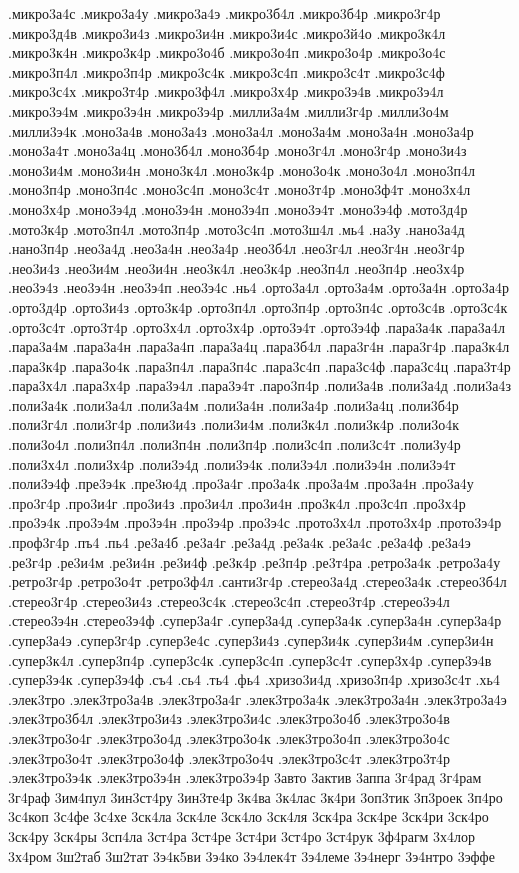 {.микро3а4с
.микро3а4у
.микро3а4э
.микро3б4л
.микро3б4р
.микро3г4р
.микро3д4в
.микро3и4з
.микро3и4н
.микро3и4с
.микро3й4о
.микро3к4л
.микро3к4н
.микро3к4р
.микро3о4б
.микро3о4п
.микро3о4р
.микро3о4с
.микро3п4л
.микро3п4р
.микро3с4к
.микро3с4п
.микро3с4т
.микро3с4ф
.микро3с4х
.микро3т4р
.микро3ф4л
.микро3х4р
.микро3э4в
.микро3э4л
.микро3э4м
.микро3э4н
.микро3э4р
.милли3а4м
.милли3г4р
.милли3о4м
.милли3э4к
.моно3а4в
.моно3а4з
.моно3а4л
.моно3а4м
.моно3а4н
.моно3а4р
.моно3а4т
.моно3а4ц
.моно3б4л
.моно3б4р
.моно3г4л
.моно3г4р
.моно3и4з
.моно3и4м
.моно3и4н
.моно3к4л
.моно3к4р
.моно3о4к
.моно3о4л
.моно3п4л
.моно3п4р
.моно3п4с
.моно3с4п
.моно3с4т
.моно3т4р
.моно3ф4т
.моно3х4л
.моно3х4р
.моно3э4д
.моно3э4н
.моно3э4п
.моно3э4т
.моно3э4ф
.мото3д4р
.мото3к4р
.мото3п4л
.мото3п4р
.мото3с4п
.мото3ш4л
.мь4
.на3у
.нано3а4д
.нано3п4р
.нео3а4д
.нео3а4н
.нео3а4р
.нео3б4л
.нео3г4л
.нео3г4н
.нео3г4р
.нео3и4з
.нео3и4м
.нео3и4н
.нео3к4л
.нео3к4р
.нео3п4л
.нео3п4р
.нео3х4р
.нео3э4з
.нео3э4н
.нео3э4п
.нео3э4с
.нь4
.орто3а4л
.орто3а4м
.орто3а4н
.орто3а4р
.орто3д4р
.орто3и4з
.орто3к4р
.орто3п4л
.орто3п4р
.орто3п4с
.орто3с4в
.орто3с4к
.орто3с4т
.орто3т4р
.орто3х4л
.орто3х4р
.орто3э4т
.орто3э4ф
.пара3а4к
.пара3а4л
.пара3а4м
.пара3а4н
.пара3а4п
.пара3а4ц
.пара3б4л
.пара3г4н
.пара3г4р
.пара3к4л
.пара3к4р
.пара3о4к
.пара3п4л
.пара3п4с
.пара3с4п
.пара3с4ф
.пара3с4ц
.пара3т4р
.пара3х4л
.пара3х4р
.пара3э4л
.пара3э4т
.паро3п4р
.поли3а4в
.поли3а4д
.поли3а4з
.поли3а4к
.поли3а4л
.поли3а4м
.поли3а4н
.поли3а4р
.поли3а4ц
.поли3б4р
.поли3г4л
.поли3г4р
.поли3и4з
.поли3и4м
.поли3к4л
.поли3к4р
.поли3о4к
.поли3о4л
.поли3п4л
.поли3п4н
.поли3п4р
.поли3с4п
.поли3с4т
.поли3у4р
.поли3х4л
.поли3х4р
.поли3э4д
.поли3э4к
.поли3э4л
.поли3э4н
.поли3э4т
.поли3э4ф
.пре3э4к
.пре3ю4д
.про3а4г
.про3а4к
.про3а4м
.про3а4н
.про3а4у
.про3г4р
.про3и4г
.про3и4з
.про3и4л
.про3и4н
.про3к4л
.про3с4п
.про3х4р
.про3э4к
.про3э4м
.про3э4н
.про3э4р
.про3э4с
.прото3х4л
.прото3х4р
.прото3э4р
.проф3г4р
.пъ4
.пь4
.ре3а4б
.ре3а4г
.ре3а4д
.ре3а4к
.ре3а4с
.ре3а4ф
.ре3а4э
.ре3г4р
.ре3и4м
.ре3и4н
.ре3и4ф
.ре3к4р
.ре3п4р
.ре3т4ра
.ретро3а4к
.ретро3а4у
.ретро3г4р
.ретро3о4т
.ретро3ф4л
.санти3г4р
.стерео3а4д
.стерео3а4к
.стерео3б4л
.стерео3г4р
.стерео3и4з
.стерео3с4к
.стерео3с4п
.стерео3т4р
.стерео3э4л
.стерео3э4н
.стерео3э4ф
.супер3а4г
.супер3а4д
.супер3а4к
.супер3а4н
.супер3а4р
.супер3а4э
.супер3г4р
.супер3е4с
.супер3и4з
.супер3и4к
.супер3и4м
.супер3и4н
.супер3к4л
.супер3п4р
.супер3с4к
.супер3с4п
.супер3с4т
.супер3х4р
.супер3э4в
.супер3э4к
.супер3э4ф
.съ4
.сь4
.ть4
.фь4
.хризо3и4д
.хризо3п4р
.хризо3с4т
.хь4
.элек3тро
.элек3тро3а4в
.элек3тро3а4г
.элек3тро3а4к
.элек3тро3а4н
.элек3тро3а4э
.элек3тро3б4л
.элек3тро3и4з
.элек3тро3и4с
.элек3тро3о4б
.элек3тро3о4в
.элек3тро3о4г
.элек3тро3о4д
.элек3тро3о4к
.элек3тро3о4п
.элек3тро3о4с
.элек3тро3о4т
.элек3тро3о4ф
.элек3тро3о4ч
.элек3тро3с4т
.элек3тро3т4р
.элек3тро3э4к
.элек3тро3э4н
.элек3тро3э4р
3авто
3актив
3аппа
3г4рад
3г4рам
3г4раф
3им4пул
3ин3ст4ру
3ин3те4р
3к4ва
3к4лас
3к4ри
3оп3тик
3п3роек
3п4ро
3с4коп
3с4фе
3с4хе
3ск4ла
3ск4ле
3ск4ло
3ск4ля
3ск4ра
3ск4ре
3ск4ри
3ск4ро
3ск4ру
3ск4ры
3сп4ла
3ст4ра
3ст4ре
3ст4ри
3ст4ро
3ст4рук
3ф4рагм
3х4лор
3х4ром
3ш2таб
3ш2тат
3э4к5ви
3э4ко
3э4лек4т
3э4леме
3э4нерг
3э4нтро
3эффе
}
